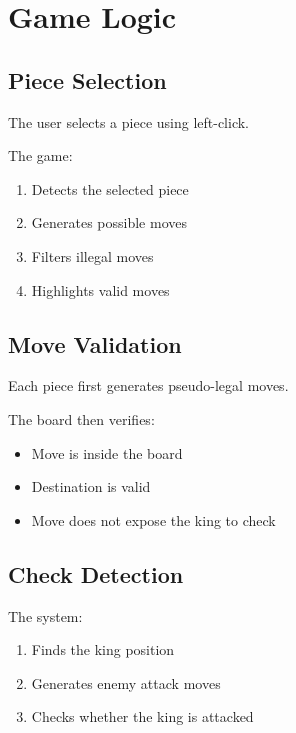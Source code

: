 \documentclass[11pt]{article}
\begin{document}

\section{Game Logic}

\subsection{Piece Selection}

The user selects a piece using left-click.

The game:

\begin{enumerate}
    \item Detects the selected piece
    \item Generates possible moves
    \item Filters illegal moves
    \item Highlights valid moves
\end{enumerate}


\subsection{Move Validation}

Each piece first generates pseudo-legal moves.

The board then verifies:

\begin{itemize}
    \item Move is inside the board
    \item Destination is valid
    \item Move does not expose the king to check
\end{itemize}


\subsection{Check Detection}

The system:

\begin{enumerate}
    \item Finds the king position
    \item Generates enemy attack moves
    \item Checks whether the king is attacked
\end{enumerate}
\end{document}
